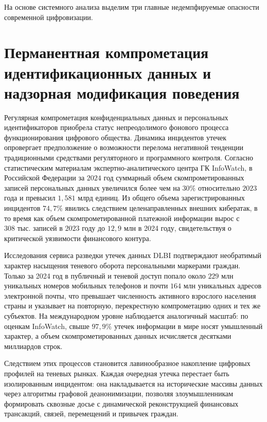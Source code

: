 \documentclass[12pt,a4paper]{article}
\begin{document}
На основе системного анализа выделим три главные недемпфируемые 
опасности современной цифровизации.

\section{Перманентная компрометация идентификационных данных и надзорная модификация поведения}

Регулярная компрометация конфиденциальных данных и персональных 
идентификаторов приобрела статус непреодолимого фонового процесса 
функционирования цифрового общества. Динамика инцидентов утечек 
опровергает предположение о возможности перелома негативной тенденции 
традиционными средствами регуляторного и программного контроля. Согласно 
статистическим материалам экспертно-аналитического центра ГК InfoWatch, 
в Российской Федерации за $2024$ год суммарный объем скомпрометированных 
записей персональных данных увеличился более чем на $30\%$ относительно 
$2023$ года и превысил $1{,}581\text{ млрд}$ единиц. Из общего объема 
зарегистрированных инцидентов $74{,}7\%$ явились следствием 
целенаправленных внешних кибератак, в то время как объем 
скомпрометированной платежной информации вырос с $308\text{ тыс.}$ 
записей в $2023$ году до $12{,}9\text{ млн}$ в 2024 году, свидетельствуя 
о критической уязвимости финансового контура.

Исследования сервиса разведки утечек данных DLBI подтверждают 
необратимый характер насыщения теневого оборота персональными 
маркерами граждан. Только за 2024 год в публичный и теневой доступ 
попало около $229\text{ млн}$ уникальных номеров мобильных телефонов 
и почти $164\text{ млн}$ уникальных адресов электронной почты, что 
превышает численность активного взрослого населения страны и указывает 
на повторную, перекрестную компрометацию одних и тех же субъектов. На 
международном уровне наблюдается аналогичный масштаб: по оценкам 
InfoWatch, свыше $97{,}9\%$ утечек информации в мире носят умышленный 
характер, а объем скомпрометированных данных исчисляется десятками 
миллиардов строк.

Следствием этих процессов становится лавинообразное накопление цифровых 
профилей на теневых рынках. Каждая очередная утечка перестает быть 
изолированным инцидентом: она накладывается на исторические массивы 
данных через алгоритмы графовой деанонимизации, позволяя злоумышленникам 
формировать сквозные досье с динамической реконструкцией финансовых 
трансакций, связей, перемещений и привычек граждан.
\end{document}

